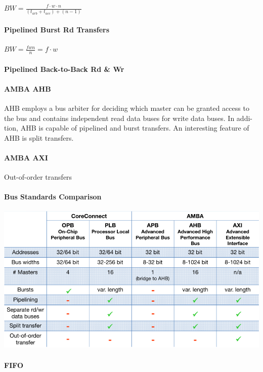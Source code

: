\documentclass[english]{latex4ei/latex4ei_sheet}
\begin{document}
$BW = \frac{f \cdot w \cdot n}{(t_{arb} + t_{acc}) + (n - 1)}$
\paragraph{Pipelined Burst Rd Transfers}

$BW = \frac{f w n}{n} = f \cdot w$

\paragraph{Pipelined Back-to-Back Rd \& Wr}

\paragraph{AMBA AHB} AHB employs a bus arbiter for deciding which master can be granted
access to the bus and contains independent read data buses for write data buses. In addi-
tion, AHB is capable of pipelined and burst transfers. An interesting feature of AHB is split
transfers.

\paragraph{AMBA AXI} Out-of-order transfers

\paragraph{Bus Standards Comparison}
\begin{center}
	\includegraphics[width=0.75\linewidth]{images//6.Interconnects/BusComparison.png}
\end{center}


\paragraph{FIFO}
\end{document}
